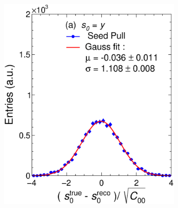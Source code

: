 \begin{figure}[t]
     \centering
     \begin{subfigure}{0.32\textwidth}
         \centering
         \includegraphics[width=\textwidth]{figures/ch5-KF_NDGAr/FullSample/Int/Units/IdealUnit0Seed.eps}
         \caption{}
         \label{fig:resp0SeedGAr_IntI}
     \end{subfigure}
     \begin{subfigure}{0.32\textwidth}
         \centering

\end{subfigure}
\end{figure}

